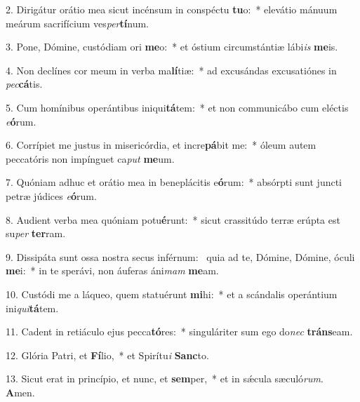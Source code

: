 2. Dirigátur orátio mea sicut incénsum in conspéctu \textbf{tu}o:~*  elevátio mánuum meárum sacrifícium ves\textit{per}\textbf{tí}num.\

3. Pone, Dómine, custódiam ori \textbf{me}o:~*  et óstium circumstántiæ lábi\textit{is} \textbf{me}is.\

4. Non declínes cor meum in verba ma\textbf{lí}tiæ:~*  ad excusándas excusatiónes in \textit{pec}\textbf{cá}tis.\

5. Cum homínibus operántibus iniqui\textbf{tá}tem:~*  et non communicábo cum eléctis \textit{e}\textbf{ó}rum.\

6. Corrípiet me justus in misericórdia, et incre\textbf{pá}bit me:~*  óleum autem peccatóris non impínguet ca\textit{put} \textbf{me}um.\

7. Quóniam adhuc et orátio mea in beneplácitis e\textbf{ó}rum:~*  absórpti sunt juncti petræ júdices \textit{e}\textbf{ó}rum.\

8. Audient verba mea quóniam potu\textbf{é}runt:~*  sicut crassitúdo terræ erúpta est su\textit{per} \textbf{ter}ram.\

9. Dissipáta sunt ossa nostra secus inférnum: \dag\  quia ad te, Dómine, Dómine, óculi \textbf{me}i:~*  in te sperávi, non áuferas áni\textit{mam} \textbf{me}am.\

10. Custódi me a láqueo, quem statuérunt \textbf{mi}hi:~*  et a scándalis operántium ini\textit{qui}\textbf{tá}tem.\

11. Cadent in retiáculo ejus pecca\textbf{tó}res:~*  singuláriter sum ego do\textit{nec} \textbf{tráns}eam.\

12. Glória Patri, et \textbf{Fí}lio,~*  et Spirítu\textit{i} \textbf{Sanc}to.\

13. Sicut erat in princípio, et nunc, et \textbf{sem}per,~*  et in sǽcula sæculó\textit{rum}. \textbf{A}men.\

